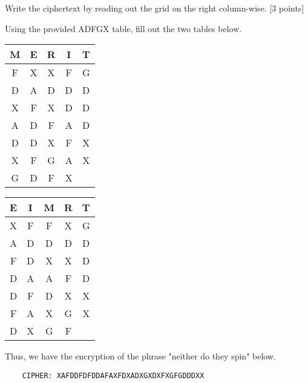 \documentclass[../hw_sols.tex]{subfiles}
\begin{document}
Write the ciphertext by reading out the grid on the right 
column-wise. [3 points]

\begin{solution}

Using the provided ADFGX table, fill out the two tables below.
	\begin{center}
	\begin{tabular}{ || c | c | c | c | c || }
		\hline
		\textbf{M} & \textbf{E} & \textbf{R} & \textbf{I} & \textbf{T} \\
		\hline
		F & X & X & F & G \\
		\hline
		D & A & D & D & D \\
		\hline
	    X & F & X & D & D \\
	    \hline
		A & D & F & A & D \\
		\hline
		D & D & X & F & X \\
		\hline
		X & F & G & A & X \\
		\hline
		G & D & F & X & \\
		\hline
	\end{tabular}
	\qquad {\Huge $\Rightarrow$} \qquad
	\begin{tabular}{ || c | c | c | c | c || }
		\hline
		\textbf{E} & \textbf{I} & \textbf{M} & \textbf{R} & \textbf{T} \\
		\hline
		X & F & F & X & G \\
		\hline
		A & D & D & D & D \\
		\hline
		F & D & X & X & D \\
		\hline
		D & A & A & F & D \\
		\hline
		D & F & D & X & X \\
		\hline
		F & A & X & G & X \\
		\hline
		D & X & G & F & \\
		\hline
	\end{tabular}
	\end{center}

Thus, we have the encryption of the phrase "neither do they spin" below.
\begin{verbatim}
    CIPHER: XAFDDFDFDDAFAXFDXADXGXDXFXGFGDDDXX
\end{verbatim}

\end{solution}


\newpage


\end{document}
